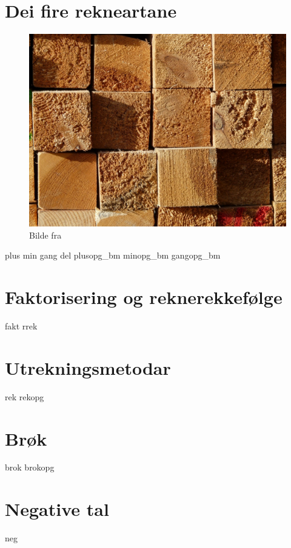 \chapter{Dei fire rekneartane \label{Rekneartane}}
\begin{figure}
	\centering
	\includegraphics[scale=0.38]{wood} \\
{\footnotesize Bilde fra } 
\end{figure}
\newpage
{plus}
{min}
{gang}
{del}
\opgt
{plusopg_bm}
{minopg_bm}
{gangopg_bm}

\chapter{Faktorisering og reknerekkefølge \label{Faktogreknrekflg}}
\newpage
{fakt}
{rrek}

\chapter{Utrekningsmetodar \label{Utrekning}}
\newpage
{rek}
\newpage
{rekopg}

\chapter{Brøk \label{Brok}}
\newpage
{brok}
\newpage
{brokopg}

\chapter{Negative tal \label{Negtal}}
\newpage
{neg}


